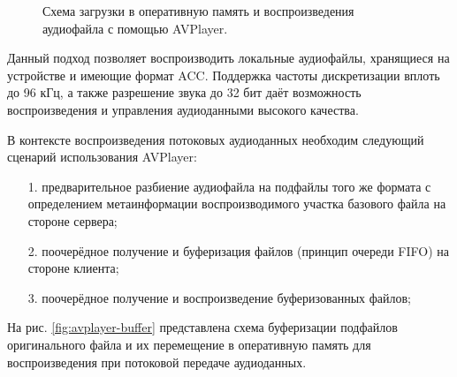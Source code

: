 		\begin{figure}[!h]
			\caption{Схема загрузки в оперативную память и воспроизведения аудиофайла с помощью AVPlayer.}
			\label{fig:avplayer-ram}
		\end{figure}

		\par Данный подход позволяет воспроизводить локальные аудиофайлы, хранящиеся на устройстве и имеющие формат ACC.
		Поддержка частоты дискретизации вплоть до 96 кГц, а также разрешение звука до 32 бит даёт возможность воспроизведения и управления
		аудиоданными высокого качества.

		\par В контексте воспроизведения потоковых аудиоданных необходим следующий сценарий использования AVPlayer:
		\begin{itemize}
			\item[1.] предварительное разбиение аудиофайла на подфайлы того же формата с определением метаинформации воспроизводимого участка базового файла на стороне сервера;
			\item[2.] поочерёдное получение и буферизация файлов (принцип очереди FIFO) на стороне клиента;
			\item[3.] поочерёдное получение и воспроизведение буферизованных файлов;
		\end{itemize}

		На рис. \ref{fig:avplayer-buffer} представлена схема буферизации подфайлов оригинального файла 
		и их перемещение в оперативную память для воспроизведения при потоковой передаче аудиоданных.

